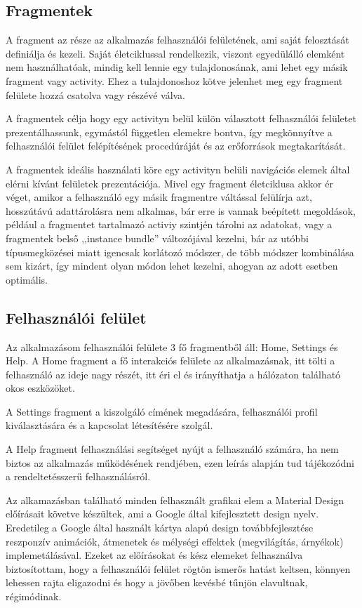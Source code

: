 \documentclass[
]{thesis-ekf}
\theoremstyle{definition}
\theoremstyle{remark}
\begin{document}
\subsection{Fragmentek}
A fragment az része az alkalmazás felhasználói felületének, ami saját felosztását definiálja és kezeli. Saját életciklussal
rendelkezik, viszont egyedülálló elemként nem használhatóak, mindig kell lennie egy tulajdonosának, ami lehet egy másik
fragment vagy activity. Ehez a tulajdonoshoz kötve jelenhet meg egy fragment felülete hozzá csatolva vagy részévé válva.

A fragmentek célja hogy egy activityn belül külön választott felhasználói felületet prezentálhassunk, egymástól független
elemekre bontva, így megkönnyítve a felhasználói felület felépítésének procedúráját és az erőforrások megtakarítását.

A fragmentek ideális használati köre egy activityn belüli navigációs elemek által elérni kívánt felületek prezentációja. Mivel egy fragment életciklusa akkor ér véget, amikor a felhasználó egy másik fragmentre váltással felülírja azt, hosszútávú
adattárolásra nem alkalmas, bár erre is vannak beépített megoldások, például a fragmentet tartalmazó activiy szintjén tárolni
az adatokat, vagy a fragmentek belső ,,instance bundle'' változójával kezelni, bár az utóbbi típusmegközései miatt igencsak
korlátozó módszer, de több módszer kombinálása sem kizárt, így mindent olyan módon lehet kezelni, ahogyan az adott esetben optimális.
\subsection{Felhasználói felület}
Az alkalmazásom felhasználói felülete 3 fő fragmentből áll: Home, Settings és Help. A Home fragment a fő interakciós felülete
az alkalmazásnak, itt tölti a felhasználó az ideje nagy részét, itt éri el és irányíthatja a hálózaton található okos eszközöket.

A Settings fragment a kiszolgáló címének megadására, felhasználói profil kiválasztására és a kapcsolat létesítésére
szolgál.

A Help fragment felhasználási segítséget nyújt a felhasználó számára, ha nem biztos az alkalmazás működésének rendjében,
ezen leírás alapján tud tájékozódni a rendeltetésszerű felhasználásról.

Az alkamazásban található minden felhasznált grafikai elem a Material Design\cite{material} előírásait követve készültek,
ami a Google által kifejlesztett design nyelv. Eredetileg a Google által használt kártya alapú design továbbfejlesztése
reszponzív animációk, átmenetek és mélységi effektek (megvilágítás, árnyékok) implemetálásával. Ezeket az előírásokat és
kész elemeket felhasználva biztosítottam, hogy a felhasználói felület rögtön ismerős hatást keltsen, könnyen lehessen rajta
eligazodni és hogy a jövőben kevésbé tűnjön elavultnak, régimódinak.
\end{document}

